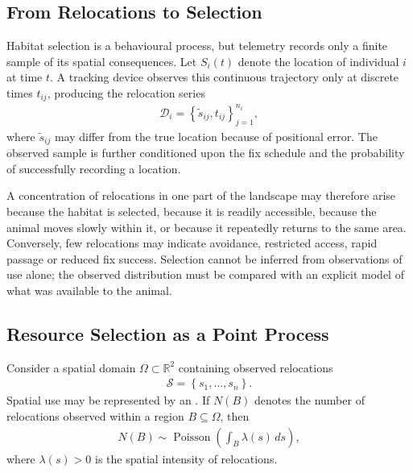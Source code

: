 \documentclass[letterpaper,10pt,english]{sphinxmanual}
\begin{document}
\subsection{From Relocations to Selection}
\label{\detokenize{theory:from-relocations-to-selection}}
\sphinxAtStartPar
Habitat selection is a behavioural process, but telemetry records only a finite sample of its spatial consequences. Let \(S_i(t)\) denote the location of individual \(i\) at time \(t\). A tracking device observes this continuous trajectory only at discrete times \(t_{ij}\), producing the relocation series
\begin{equation*}
\begin{split}
\mathcal{D}_i
=
\left\{
\tilde{s}_{ij},t_{ij}
\right\}_{j=1}^{n_i},
\end{split}
\end{equation*}
\sphinxAtStartPar
where \(\tilde{s}_{ij}\) may differ from the true location because of positional error. The observed sample is further conditioned upon the fix schedule and the probability of successfully recording a location.

\sphinxAtStartPar
A concentration of relocations in one part of the landscape may therefore arise because the habitat is selected, because it is readily accessible, because the animal moves slowly within it, or because it repeatedly returns to the same area. Conversely, few relocations may indicate avoidance, restricted access, rapid passage or reduced fix success. Selection cannot be inferred from observations of use alone; the observed distribution must be compared with an explicit model of what was available to the animal.


\subsection{Resource Selection as a Point Process}
\label{\detokenize{theory:resource-selection-as-a-point-process}}
\sphinxAtStartPar
Consider a spatial domain \(\Omega\subset\mathbb{R}^{2}\) containing observed relocations
\begin{equation*}
\begin{split}
\mathcal{S}
=
\left\{
s_1,\ldots,s_n
\right\}.
\end{split}
\end{equation*}
\sphinxAtStartPar
Spatial use may be represented by an . If \(N(B)\) denotes the number of relocations observed within a region \(B\subseteq\Omega\), then
\begin{equation*}
\begin{split}
N(B)
\sim
\operatorname{Poisson}
\left(
\int_B \lambda(s)\,ds
\right),
\end{split}
\end{equation*}
\sphinxAtStartPar
where \(\lambda(s)>0\) is the spatial intensity of relocations.
\end{document}
